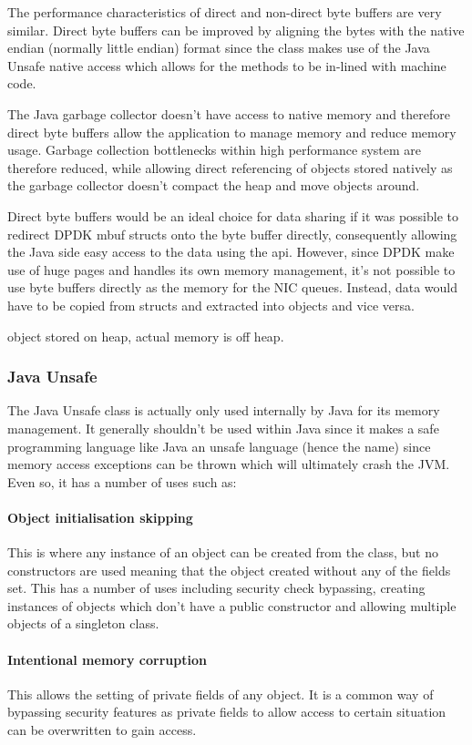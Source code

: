 \documentclass[final_report.tex]{subfiles}
\begin{document}
The performance characteristics of direct and non-direct byte buffers are very similar. Direct byte buffers can be improved by aligning the bytes with the native endian (normally little endian) format since the class makes use of the Java Unsafe native access which allows for the methods to be in-lined with machine code.

The Java garbage collector doesn't have access to native memory and therefore direct byte buffers allow the application to manage memory and reduce memory usage. Garbage collection bottlenecks within high performance system are therefore reduced, while allowing direct referencing of objects stored natively as the garbage collector doesn't compact the heap and move objects around.

Direct byte buffers would be an ideal choice for data sharing if it was possible to redirect DPDK mbuf structs onto the byte buffer directly, consequently allowing the Java side easy access to the data using the api. However, since DPDK make use of huge pages and handles its own memory management, it's not possible to use byte buffers directly as the memory for the NIC queues. Instead, data would have to be copied from structs and extracted into objects and vice versa.

object stored on heap, actual memory is off heap.

\subsubsection{Java Unsafe}
The Java Unsafe class is actually only used internally by Java for its memory management. It generally shouldn't be used within Java since it makes a safe programming language like Java an unsafe language (hence the name) since memory access exceptions can be thrown which will ultimately crash the JVM. Even so, it has a number of uses such as:

\paragraph*{Object initialisation skipping}
This is where any instance of an object can be created from the class, but no constructors are used meaning that the object created without any of the fields set. This has a number of uses including security check bypassing, creating instances of objects which don't have a public constructor and allowing multiple objects of a singleton class.

\paragraph*{Intentional memory corruption}
This allows the setting of private fields of any object. It is a common way of bypassing security features as private fields to allow access to certain situation can be overwritten to gain access.
\end{document}
